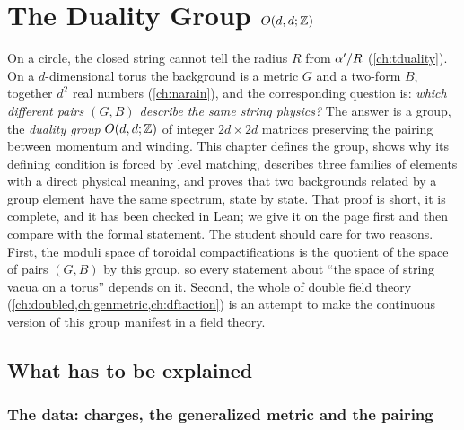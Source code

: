 \chapter{The Duality Group \texorpdfstring{$O(d,d;\mathbb{Z})$}{O(d,d;Z)}}\label{ch:odd}

On a circle, the closed string cannot tell the radius $R$ from $\alpha'/R$
(\cref{ch:tduality}). On a $d$-dimensional torus the background is a metric $G$ and a
two-form $B$, together $d^2$ real numbers (\cref{ch:narain}), and the corresponding question
is: \emph{which different pairs $(G,B)$ describe the same string physics?} The answer is a
group, the \emph{duality group} $O(d,d;\mathbb{Z})$ of integer $2d\times2d$
matrices preserving the pairing between momentum and winding. This chapter defines the
group, shows why its defining condition is forced by level matching, describes three
families of elements with a direct physical meaning, and proves that two backgrounds related
by a group element have the same spectrum, state by state. That proof is short, it is
complete, and it has been checked in Lean; we give it on the page first and then compare
with the formal statement. The student should care for two reasons. First, the moduli space
of toroidal compactifications is the quotient of the space of pairs $(G,B)$ by this group,
so every statement about ``the space of string vacua on a torus'' depends on it. Second, the
whole of double field theory (\cref{ch:doubled,ch:genmetric,ch:dftaction}) is an attempt to
make the continuous version of this group manifest in a field theory.

\section{What has to be explained}\label{sec:odd:setting}

\subsection{The data: charges, the generalized metric and the pairing}


